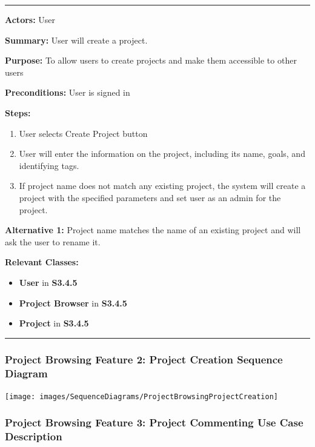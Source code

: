 \documentclass[twoside,letterpaper]{article}
\begin{document}
\vspace{2pt}
\hrule
\vspace{8pt}
\textbf{Actors:} User \newline

\noindent\textbf{Summary:} User will create a project. \newline

\noindent\textbf{Purpose:} To allow users to create projects and make them accessible to other users \newline

\noindent\textbf{Preconditions:} User is signed in \newline

\noindent\textbf{Steps:} \begin{enumerate}
	\item User selects Create Project button
	\item User will enter the information on the project, including its name, goals, and identifying tags.
	\item If project name does not match any existing project, the system will create a project with the specified parameters and set user as an admin for the project.
\end{enumerate}
\noindent\textbf{Alternative 1:} Project name matches the name of an existing project and will ask the user to rename it. \newline


\noindent\textbf{Relevant Classes:}
\begin{itemize}
	\item \textbf{User} in \textbf{S3.4.5}
	\item \textbf{Project Browser} in \textbf{S3.4.5}
	\item \textbf{Project} in \textbf{S3.4.5}
\end{itemize}
\vspace{8pt}
\hrule
\newpage
\subsubsection[Project Browsing Feature 2: Project Creation Sequence Diagram]{\rmfamily\bfseries\color{black}
	Project Browsing Feature 2: Project Creation Sequence Diagram}
\hypertarget{RefHeading22059017292}{}

\bigskip

\texttt{[image: images/SequenceDiagrams/ProjectBrowsingProjectCreation]}

\newpage
\subsubsection[Project Browsing Feature 3: Project Commenting Use Case Description]{\rmfamily\bfseries\color{black}
Project Browsing Feature 3: Project Commenting Use Case Description}
\hypertarget{RefHeading22059017292}{}
\end{document}
